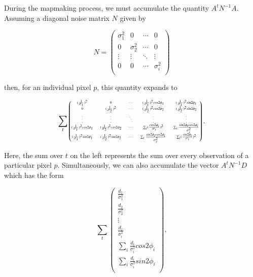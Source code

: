 \documentclass{aa}
\begin{document}
During the mapmaking process, we must accumulate the quantity $A^tN^{-1}A$. Assuming a diagonal noise matrix $N$ given by

\begin{equation}
N = \begin{pmatrix}
\sigma^2_1 & 0 & \cdots & 0 \\
0 & \sigma^2_2 & \cdots & 0 \\
\vdots & \vdots & \ddots & \vdots \\
0 & 0 & \cdots & \sigma^2_i \\
\end{pmatrix}
\end{equation}

then, for an individual pixel $p$, this quantity expands to

\begin{equation*}
\begin{tiny}
\sum_t
\begin{pmatrix}
(\frac{1}{\sigma_1})^2 & 0 & \cdots &
(\frac{1}{\sigma_1})^2 cos2\phi_1 & (\frac{1}{\sigma_1})^2 sin2\phi_1 \\

0 & (\frac{1}{\sigma_2})^2 & \cdots &
(\frac{1}{\sigma_2})^2 cos2\phi_2 & (\frac{1}{\sigma_2})^2 sin2\phi_2 \\

\vdots & \vdots & \ddots & \vdots & \vdots \\

(\frac{1}{\sigma_1})^2 cos2\phi_1 & (\frac{1}{\sigma_2})^2 cos2\phi_2 & \cdots & 
\sum_{i} (\frac{cos 2\phi_i}{\sigma_i})^2 & \sum_{i} \frac{sin2\phi_t cos2\phi_i}{\sigma_i^2}  \\

(\frac{1}{\sigma_1})^2 sin2\phi_1 & (\frac{1}{\sigma_2})^2 sin2\phi_2 & \cdots &
\sum_{i} \frac{sin2\phi_i cos2\phi_i}{\sigma_i^2}  & \sum_{i} (\frac{ sin 2\phi_i}{\sigma_i})^2
\\

\end{pmatrix}
\end{tiny}.
\end{equation*}

Here, the sum over $t$ on the left represents the sum over every observation of a particular pixel $p$. Simultaneously, we can also accumulate the vector $A^tN^{-1} D$ which has the form

\begin{equation}
\sum_t
\begin{pmatrix}
\frac{d_{1}}{\sigma_1^2} \\
\frac{d_{2}}{\sigma_2^2}\\
\vdots\\
\frac{d_{i}}{\sigma_i^2}\\
\sum_i \frac{d_{i}}{\sigma_i^2} cos2\phi_i\\
\sum_i \frac{d_{i}}{\sigma_i^2} sin2\phi_i\\
\end{pmatrix},
\end{equation}
\end{document}
